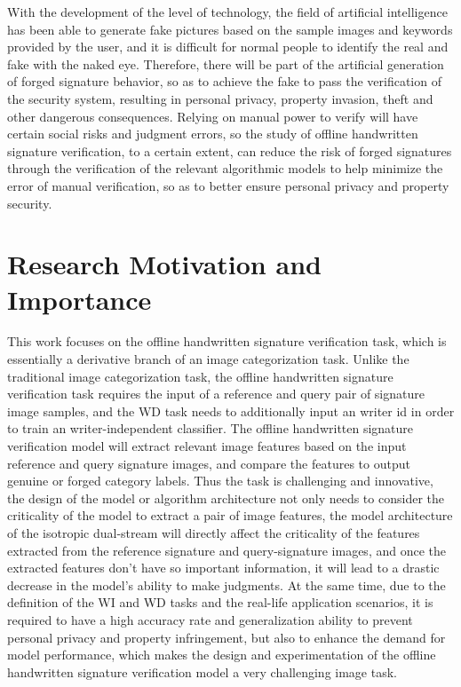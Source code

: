 With the development of the level of technology, the field of artificial intelligence has been able to generate fake pictures based on the sample images and keywords provided by the user, and it is difficult for normal people to identify the real and fake with the naked eye. Therefore, there will be part of the artificial generation of forged signature behavior, so as to achieve the fake to pass the verification of the security system, resulting in personal privacy, property invasion, theft and other dangerous consequences. Relying on manual power to verify will have certain social risks and judgment errors, so the study of offline handwritten signature verification, to a certain extent, can reduce the risk of forged signatures through the verification of the relevant algorithmic models to help minimize the error of manual verification, so as to better ensure personal privacy and property security.

\section{Research Motivation and Importance}

This work focuses on the offline handwritten signature verification task, which is essentially a derivative branch of an image categorization task. Unlike the traditional image categorization task, the offline handwritten signature verification task requires the input of a reference and query pair of signature image samples, and the WD task needs to additionally input an writer id in order to train an writer-independent classifier. The offline handwritten signature verification model will extract relevant image features based on the input reference and query signature images, and compare the features to output genuine or forged category labels. Thus the task is challenging and innovative, the design of the model or algorithm architecture not only needs to consider the criticality of the model to extract a pair of image features, the model architecture of the isotropic dual-stream will directly affect the criticality of the features extracted from the reference signature and query-signature images, and once the extracted features don't have so important information, it will lead to a drastic decrease in the model's ability to make judgments. At the same time, due to the definition of the WI and WD tasks and the real-life application scenarios, it is required to have a high accuracy rate and generalization ability to prevent personal privacy and property infringement, but also to enhance the demand for model performance, which makes the design and experimentation of the offline handwritten signature verification model a very challenging image task.

